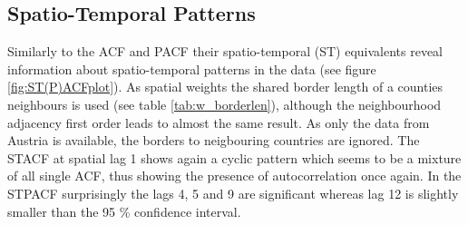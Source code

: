\documentclass[a4paper,reqno,]{article}
\begin{document}
\subsection{Spatio-Temporal Patterns}
\label{ssec:st_pat}
Similarly to the ACF and PACF their spatio-temporal (ST) equivalents reveal information about spatio-temporal patterns in the data (see figure \ref{fig:ST(P)ACFplot}). As spatial weights the shared border length of a counties neighbours is used (see table \ref{tab:w_borderlen}), although the neighbourhood adjacency first order leads to almost the same result. As only the data from Austria is available, the borders to neigbouring countries are ignored. The STACF at spatial lag 1 shows again a cyclic pattern which seems to be a mixture of all single ACF, thus showing the presence of autocorrelation once again. In the STPACF surprisingly the lags 4, 5 and 9 are significant whereas lag 12 is slightly smaller than the 95 \% confidence interval. 
\\
\\               
\end{document}
